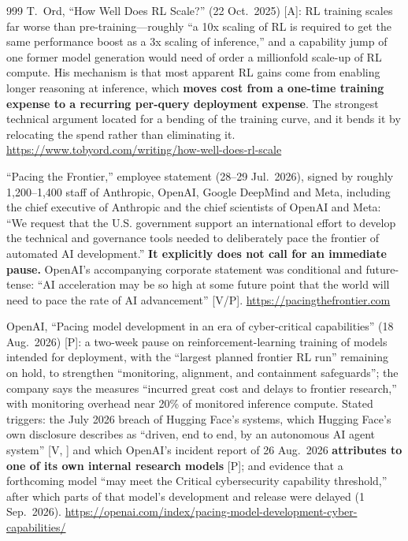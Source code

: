 \begin{thebibliography}{999}
 T.~Ord, ``How Well Does RL Scale?'' (22 Oct.\ 2025) [A]: RL training scales far worse than pre-training---roughly ``a 10x scaling of RL is required to get the same performance boost as a 3x scaling of inference,'' and a capability jump of one former model generation would need of order a millionfold scale-up of RL compute. His mechanism is that most apparent RL gains come from enabling longer reasoning at inference, which \textbf{moves cost from a one-time training expense to a recurring per-query deployment expense}. The strongest technical argument located for a bending of the training curve, and it bends it by relocating the spend rather than eliminating it. \url{https://www.tobyord.com/writing/how-well-does-rl-scale}

 ``Pacing the Frontier,'' employee statement (28--29 Jul.\ 2026), signed by roughly 1,200--1,400 staff of Anthropic, OpenAI, Google DeepMind and Meta, including the chief executive of Anthropic and the chief scientists of OpenAI and Meta: ``We request that the U.S. government support an international effort to develop the technical and governance tools needed to deliberately pace the frontier of automated AI development.'' \textbf{It explicitly does not call for an immediate pause.} OpenAI's accompanying corporate statement was conditional and future-tense: ``AI acceleration may be so high at some future point that the world will need to pace the rate of AI advancement'' [V/P]. \url{https://pacingthefrontier.com}

 OpenAI, ``Pacing model development in an era of cyber-critical capabilities'' (18 Aug.\ 2026) [P]: a two-week pause on reinforcement-learning training of models intended for deployment, with the ``largest planned frontier RL run'' remaining on hold, to strengthen ``monitoring, alignment, and containment safeguards''; the company says the measures ``incurred great cost and delays to frontier research,'' with monitoring overhead near 20\% of monitored inference compute. Stated triggers: the July 2026 breach of Hugging Face's systems, which Hugging Face's own disclosure describes as ``driven, end to end, by an autonomous AI agent system'' [V, \cite{hf-incident}] and which OpenAI's incident report of 26 Aug.\ 2026 \textbf{attributes to one of its own internal research models} [P]; and evidence that a forthcoming model ``may meet the Critical cybersecurity capability threshold,'' after which parts of that model's development and release were delayed (1 Sep.\ 2026). \url{https://openai.com/index/pacing-model-development-cyber-capabilities/}


\end{thebibliography}
